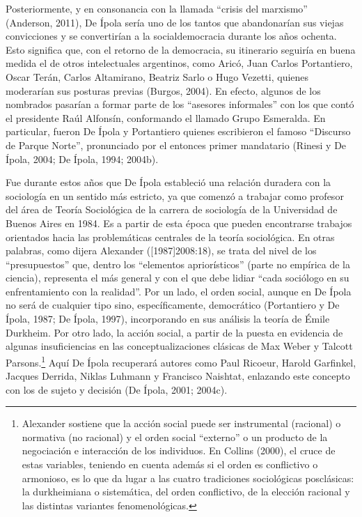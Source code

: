 Posteriormente, y en consonancia con la llamada ``crisis del marxismo'' (Anderson, 2011), De Ípola sería uno de los tantos que abandonarían sus viejas convicciones y se convertirían a la socialdemocracia durante los años ochenta. Esto significa que, con el retorno de la democracia, su itinerario seguiría en buena medida el de otros intelectuales argentinos, como Aricó, Juan Carlos Portantiero, Oscar Terán, Carlos Altamirano, Beatriz Sarlo o Hugo Vezetti, quienes moderarían sus posturas previas (Burgos, 2004). En efecto, algunos de los nombrados pasarían a formar parte de los ``asesores informales'' con los que contó el presidente Raúl Alfonsín, conformando el llamado Grupo Esmeralda. En particular, fueron De Ípola y Portantiero quienes escribieron el famoso ``Discurso de Parque Norte'', pronunciado por el entonces primer mandatario (Rinesi y De Ípola, 2004; De Ípola, 1994; 2004b).

Fue durante estos años que De Ípola estableció una relación duradera con la sociología en un sentido más estricto, ya que comenzó a trabajar como profesor del área de Teoría Sociológica de la carrera de sociología de la Universidad de Buenos Aires en 1984. Es a partir de esta época que pueden encontrarse trabajos orientados hacia las problemáticas centrales de la teoría sociológica. En otras palabras, como dijera Alexander ({[}1987{]}2008:18), se trata del nivel de los ``presupuestos'' que, dentro los ``elementos apriorísticos'' (parte no empírica de la ciencia), representa el más general y con el que debe lidiar ``cada sociólogo en su enfrentamiento con la realidad''. Por un lado, el orden social, aunque en De Ípola no será de cualquier tipo sino, específicamente, democrático (Portantiero y De Ípola, 1987; De Ípola, 1997), incorporando en sus análisis la teoría de Émile Durkheim. Por otro lado, la acción social, a partir de la puesta en evidencia de algunas insuficiencias en las conceptualizaciones clásicas de Max Weber y Talcott Parsons.\footnote{Alexander sostiene que la acción social puede ser instrumental (racional) o normativa (no racional) y el orden social ``externo'' o un producto de la negociación e interacción de los individuos. En Collins (2000), el cruce de estas variables, teniendo en cuenta además si el orden es conflictivo o armonioso, es lo que da lugar a las cuatro tradiciones sociológicas posclásicas: la durkheimiana o sistemática, del orden conflictivo, de la elección racional y las distintas variantes fenomenológicas.} Aquí De Ípola recuperará autores como Paul Ricoeur, Harold Garfinkel, Jacques Derrida, Niklas Luhmann y Francisco Naishtat, enlazando este concepto con los de sujeto y decisión (De Ípola, 2001; 2004c).

